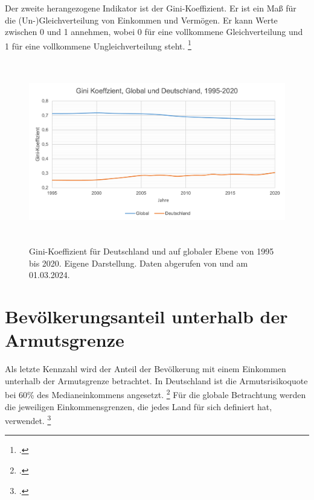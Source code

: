 Der zweite herangezogene Indikator ist der Gini-Koeffizient. Er ist ein Ma{\ss} für die (Un-)Gleichverteilung von Einkommen und Vermögen. Er kann Werte zwischen 0 und 1 annehmen, wobei 0 für eine vollkommene Gleichverteilung und 1 für eine vollkommene Ungleichverteilung steht. \footcite[Vgl.][]{gini_definition_diw_2024}

\begin{figure}[H]
    \centering
    \includegraphics[height=8cm]{Bilder/Gini-Koeffizient2.png}
    \caption[Gini-Koeffizient, Deutschland und global, 1995-2020]{Gini-Koeffizient für Deutschland und auf globaler Ebene von 1995 bis 2020. Eigene Darstellung. Daten abgerufen von \cite[][, S.56 (global)]{wir_2022} und \cite[][(Deutschland)]{bmas_arb_gini_2020} am 01.03.2024.}
    \label{fig:iso_norm}
\end{figure}

\section{Bevölkerungsanteil unterhalb der Armutsgrenze}

Als letzte Kennzahl wird der Anteil der Bevölkerung mit einem Einkommen unterhalb der Armutsgrenze betrachtet. In Deutschland ist die Armutsrisikoquote bei 60\% des Medianeinkommens angesetzt. \footcite[Vgl.][]{bmas_arb_armutsrisikoquote_2023} Für die globale Betrachtung werden die jeweiligen Einkommensgrenzen, die jedes Land für sich definiert hat, verwendet. \footcite[Vgl.][]{wb_armutsquote_global_2022}

